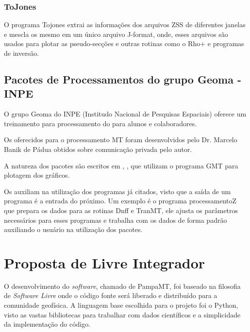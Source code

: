             
    \subsection{ToJones}
    
            O programa Tojones \cite{tojones} extrai as informações dos arquivos ZSS de diferentes janelas e mescla os mesmo em um único arquivo J-format, onde, esses arquivos são usados para plotar as pseudo-secções e outras rotinas como o Rho+ \cite{rhoplus} e programas de inversão.
            
    \section{Pacotes de Processamentos do grupo Geoma - INPE}
    
        O grupo Geoma do INPE (Institudo Nacional de Pesquisas Espaciais) oferece um treinamento para processamento do \MT para alunos e colaboradores.
        
        Os  oferecidos para o processamento MT foram desenvolvidos pelo Dr. Marcelo Banik de Pádua obtidos sobre comunicação privada pelo autor.
        
        A natureza dos pacotes são  escritos em , ,  que utilizam o programa GMT \cite{gmt} para plotagem dos gráficos.
        
        Os  auxiliam na utilização dos programas já citados, visto que a saída de um programa é a entrada do próximo. Um exemplo é o programa processamentoZ que prepara os dados para as rotinas Dnff e TranMT, ele ajusta os parâmetros necessários para esses programas e trabalha com os dados de forma padrão auxiliando o usuário na utilização dos pacotes. 
        
       
    
    

    
    
    \chapter{Proposta de  Livre Integrador}
    
        O desenvolvimento do \textit{software}, chamado de PampaMT, foi baseado na filosofia de \textit{Software Livre} \cite{soft_free} onde o código fonte será liberado e distribuído para a comunidade geofísica. A linguagem base escolhida para o projeto foi o Python, visto as vastas bibliotecas para trabalhar com dados científicos e a simplicidade da implementação do código.  
        
